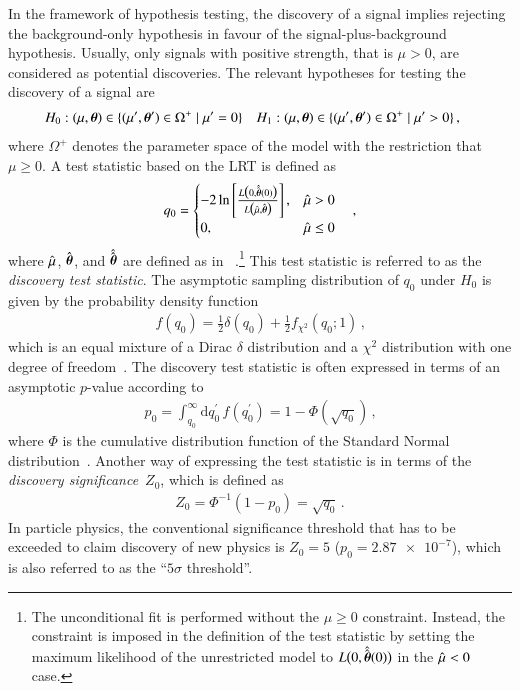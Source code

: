 In the framework of hypothesis testing, the discovery of a signal implies
rejecting the background-only hypothesis in favour of the signal-plus-background
hypothesis. Usually, only signals with positive strength, that is $\mu > 0$, are
considered as potential discoveries. The relevant hypotheses for testing the
discovery of a signal are
\begin{align*}
  &H_0: (\mu, \myvec{\theta}) \in \{ (\mu^\prime, \myvec{\theta}^\prime) \in \Omega^+ \mid \mu^\prime = 0 \}
  &&H_1: (\mu, \myvec{\theta}) \in \{ (\mu^\prime, \myvec{\theta}^\prime) \in \Omega^+ \mid \mu^\prime > 0 \} \,\text{,}
\end{align*}
where $\Omega^+$ denotes the parameter space of the model with the restriction
that $\mu \geq 0$. A test statistic based on the LRT is defined
as
\begin{align*}
  q_0 = \begin{cases}
          -2 \ln \left[ \frac{ L\bigl(0, \hat{\hat{\myvec{\theta}}}(0) \bigr)}{L\bigl( \muhat, \hat{\myvec{\theta}} \bigr)} \right], & \muhat > 0 \\
          0,          & \muhat \leq 0
        \end{cases} \quad\text{,}
\end{align*}
where $\hat{\mu}$, $\hat{\myvec{\theta}}$, and $\hat{\hat{\myvec{\theta}}}$ are
defined as in
~\cite{Cowan:2010js}.\footnote{The
  unconditional fit is performed without the $\mu \geq 0$ constraint. Instead,
  the constraint is imposed in the definition of the test statistic by setting
  the maximum likelihood of the unrestricted model to
  $L\bigl( 0, \hat{\hat{\myvec{\theta}}}(0) \bigr)$ in the $\hat{\mu} < 0$ case.}
This test statistic is referred to as the \emph{discovery test statistic}. The
asymptotic sampling distribution of $q_0$ under $H_0$ is given by the
probability density function
\begin{align*}
  f(q_0) = \frac{1}{2} \delta(q_0) + \frac{1}{2} f_{\chi^2}(q_0; 1) \,\text{,}
\end{align*}
which is an equal mixture of a Dirac $\delta$ distribution and a $\chi^2$
distribution with one degree of freedom~\cite{Cowan:2010js}. The discovery test
statistic is often expressed in terms of an asymptotic $p$-value according
to
\begin{align*}
  p_0 = \int_{q_{0}}^\infty \mathrm{d}q_0^\prime \, f(q_0^\prime) =
  1 - \Phi\left(\sqrt{q_{0}}\right) \,\text{,}
\end{align*}
where $\Phi$ is the cumulative distribution function of the Standard Normal
distribution~\cite{Cowan:2010js}. Another way of expressing the test statistic
is in terms of the \emph{discovery significance}~$Z_0$, which is defined
as~\cite{Cowan:2010js}
\begin{align*}
  Z_0 = \Phi^{-1}(1 - p_0) = \sqrt{q_{0}} \,\text{.}
\end{align*}
In particle physics, the conventional significance threshold that has to be
exceeded to claim discovery of new physics is $Z_0 = 5$ ($p_0 = \num{2.87e-7}$),
which is also referred to as the ``$5\sigma$ threshold''.


